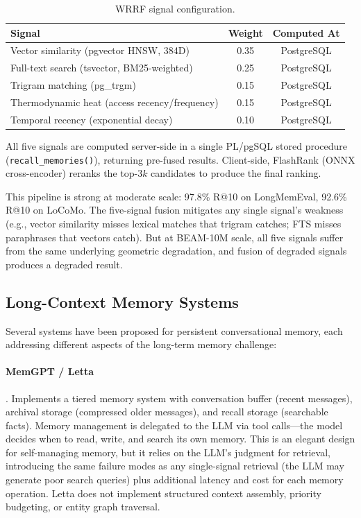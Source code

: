 \documentclass[11pt]{article}
\newcommand{\eg}{e.g.}
\begin{document}
\begin{table}[h]
\centering
\caption{WRRF signal configuration.}
\label{tab:wrrf-signals}
\begin{tabular}{lcc}
\toprule
Signal & Weight & Computed At \\
\midrule
Vector similarity (pgvector HNSW, 384D) & 0.35 & PostgreSQL \\
Full-text search (tsvector, BM25-weighted) & 0.25 & PostgreSQL \\
Trigram matching (pg\_trgm) & 0.15 & PostgreSQL \\
Thermodynamic heat (access recency/frequency) & 0.15 & PostgreSQL \\
Temporal recency (exponential decay) & 0.10 & PostgreSQL \\
\bottomrule
\end{tabular}
\end{table}

All five signals are computed server-side in a single PL/pgSQL stored
procedure (\texttt{recall\_memories()}), returning pre-fused results.
Client-side, FlashRank (ONNX cross-encoder) reranks the top-$3k$
candidates to produce the final ranking.

This pipeline is strong at moderate scale: 97.8\% R@10 on
LongMemEval, 92.6\% R@10 on LoCoMo.  The five-signal fusion
mitigates any single signal's weakness (\eg, vector similarity
misses lexical matches that trigram catches; FTS misses paraphrases
that vectors catch).  But at BEAM-10M scale, all five signals suffer
from the same underlying geometric degradation, and fusion of
degraded signals produces a degraded result.

\subsection{Long-Context Memory Systems}
\label{sec:memory-systems}

Several systems have been proposed for persistent conversational
memory, each addressing different aspects of the long-term memory
challenge:

\paragraph{MemGPT / Letta} \citep{Packer2024}.
Implements a tiered memory system with conversation buffer (recent
messages), archival storage (compressed older messages), and recall
storage (searchable facts).  Memory management is delegated to the
LLM via tool calls---the model decides when to read, write, and
search its own memory.  This is an elegant design for self-managing
memory, but it relies on the LLM's judgment for retrieval,
introducing the same failure modes as any single-signal retrieval
(the LLM may generate poor search queries) plus additional latency
and cost for each memory operation.  Letta does not implement
structured context assembly, priority budgeting, or entity graph
traversal.
\end{document}
